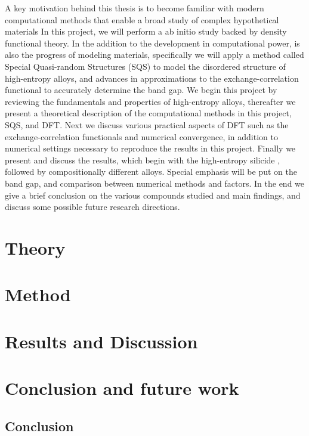 \documentclass[UKenglish]{ifimaster}  %
\begin{document}
A key motivation behind this thesis is to become familiar with modern computational methods that enable a broad study of complex hypothetical materials  In this project, we will perform a ab initio study backed by density functional theory. In the addition to the development in computational power, is also the progress of modeling materials, specifically we will apply a method called Special Quasi-random Structures (SQS) to model the disordered structure of  high-entropy alloys, and advances in approximations to the exchange-correlation functional to accurately determine the band gap. We begin this project by reviewing the fundamentals and properties of high-entropy alloys, thereafter we present a theoretical description of the computational methods in this project, SQS, and DFT. Next we discuss various practical aspects of DFT such as the exchange-correlation functionals and numerical convergence, in addition to numerical settings necessary to reproduce the results in this project. Finally we present and discuss the results, which begin with the high-entropy silicide , followed by compositionally different alloys. Special emphasis will be put on the band gap, and comparison between numerical methods and factors. In the end we give a brief conclusion on the various compounds studied and main findings, and discuss some possible future research directions.   


\part{Theory}                    %




\part{Method}


 
\part{Results and Discussion}




\part{Conclusion and future work}
\chapter{Conclusion}
\end{document}
